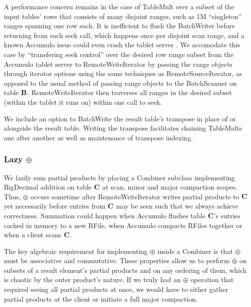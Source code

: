 A performance concern remains in the case of TableMult over a subset of the input tables' rows 
that consists of many disjoint ranges, such as 1M ``singleton'' ranges spanning one row each.
It is inefficient to flush the BatchWriter before returning from each seek call, which happens once per 
disjoint scan range, and a known Accumulo issue could even crash the tablet server \cite{ACCUMULO-3710}.
We accomodate this case by ``transfering seek control'' over the desired row range
subset from the Accumulo tablet server to RemoteWriteIterator by passing the range objects through 
iterator options using the same techniques as RemoteSourceIterator, as opposed to the usual method of 
passing range objects to the %
BatchScanner on table $\mathbf{B}$.
RemoteWriteIterator then traverses all ranges in the desired subset 
(within the tablet it runs on) within one call to seek.

We include an option to BatchWrite the result table's transpose in place of or alongside
the result table. Writing the transpose facilitates chaining TableMults one after another
as well as maintenance of transpose indexing.

\subsubsection{Lazy $\oplus$}
We lazily sum partial products by placing a Combiner subclass implementing BigDecimal addition 
on table $\mathbf{C}$ at scan, minor and major compaction scopes.
Thus, $\oplus$ occurs sometime after RemoteWriteIterator writes partial products to $\mathbf{C}$
yet necessarily before entries from $\mathbf{C}$ may be seen such that we always achieve correctness.
Summation could happen when Accumulo flushes table $\mathbf{C}$'s entries cached in memory to a new RFile, 
when Accumulo compacts RFiles together or when a client scans $\mathbf{C}$. 

The key algebraic requirement for implementing $\oplus$ inside a Combiner
is that $\oplus$ must be associative and commutative.
These properties allow us to perform $\oplus$ on subsets of a result element's partial products 
and on any ordering of them, which is chaotic by the outer product's nature.
If we truly had an $\oplus$ operation that required seeing all partial products at once,
we would have to either gather partial products at the client or initiate a full major compaction.

